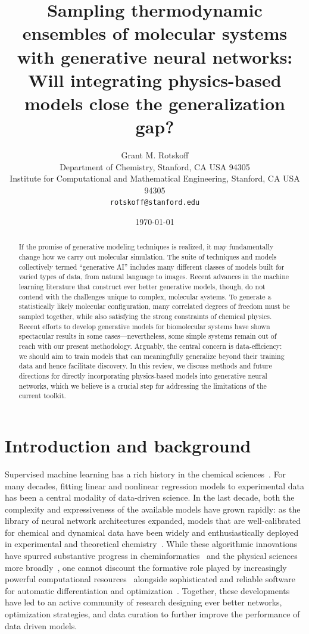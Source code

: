 \documentclass[11pt]{article}
\title{Sampling thermodynamic ensembles of molecular systems with generative neural networks: Will integrating physics-based models close the generalization gap?}
\author{Grant M. Rotskoff\\
Department of Chemistry, Stanford, CA USA 94305\\
Institute for Computational and Mathematical Engineering, Stanford, CA USA 94305\\
\texttt{rotskoff@stanford.edu}}
\date{\today}
\begin{document}
\maketitle

\begin{abstract}
If the promise of generative modeling techniques is realized, it may fundamentally change how we carry out molecular simulation.
The suite of techniques and models collectively termed ``generative AI'' includes many different classes of models built for varied types of data, from natural language to images.
Recent advances in the machine learning literature that construct ever better generative models, though, do not contend with the challenges unique to complex, molecular systems. 
To generate a statistically likely molecular configuration, many correlated degrees of freedom must be sampled together, while also satisfying the strong constraints of chemical physics. 
Recent efforts to develop generative models for biomolecular systems have shown spectacular results in some cases---nevertheless, some simple systems remain out of reach with our present methodology.
Arguably, the central concern is data-efficiency: we should aim to train models that can meaningfully generalize beyond their training data and hence facilitate discovery.
In this review, we discuss methods and future directions for directly incorporating physics-based models into generative neural networks, which we believe is a crucial step for addressing the limitations of the current toolkit.
\end{abstract}


\section{Introduction and background}
\label{sec:intro}


Supervised machine learning has a rich history in the chemical sciences~\cite{lederberg_applications_1969}. 
For many decades, fitting linear and nonlinear regression models to experimental data has been a central modality of data-driven science.
In the last decade, both the complexity and expressiveness of the available models have grown rapidly: as the library of neural network architectures expanded, models that are well-calibrated for chemical and dynamical data have been widely and enthusiastically deployed in experimental and theoretical chemistry~\cite{mater_deep_2019}. 
While these algorithmic innovations have spurred substantive progress in cheminformatics~\cite{mater_deep_2019} and the physical sciences more broadly~\cite{carleo_machine_2019}, one cannot discount the formative role played by increasingly powerful computational resources~\cite{amodei_ai_2018} alongside sophisticated and reliable software for automatic differentiation and optimization~\cite{paszke_pytorch_2019, bradbury_jax_2018, broughton_tensorflow_2020}. 
Together, these developments have led to an active community of research designing ever better networks, optimization strategies, and data curation to further improve the performance of data driven models.
\end{document}
